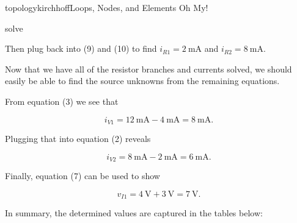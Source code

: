 \begin{mainquestion}{topologykirchhoff}{Loops, Nodes, and Elements Oh My!}
\begin{partquestion}{solve}
\begin{answer}
Then plug back into (9) and (10) to find
$i_{R1}=\qty{2}{\milli\ampere}$ and
$i_{R2}=\qty{8}{\milli\ampere}$.

Now that we have all of the resistor branches and currents solved, we should easily be able to find the source unknowns from the remaining equations.

From equation (3) we see that

\[
i_{V1}
=
\qty{12}{\milli\ampere}
-
\qty{4}{\milli\ampere}
=
\qty{8}{\milli\ampere}.
\]

Plugging that into equation (2) reveals

\[
i_{V2}
=
\qty{8}{\milli\ampere}
-
\qty{2}{\milli\ampere}
=
\qty{6}{\milli\ampere}.
\]

Finally, equation (7) can be used to show

\[
v_{I1}
=
\qty{4}{\volt}
+
\qty{3}{\volt}
=
\qty{7}{\volt}.
\]

In summary, the determined values are captured in the tables below:

\begin{table}[htbp]
\centering


\end{table}
\end{answer}
\end{partquestion}
\end{mainquestion}
